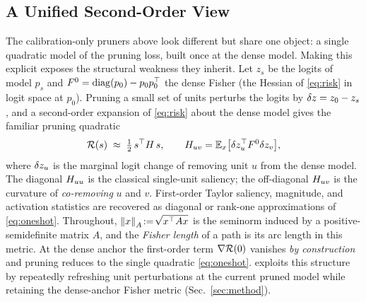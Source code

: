 \subsection{A Unified Second-Order View}
The calibration-only pruners above look different but share one object: a single quadratic model of the
pruning loss, built once at the dense model. Making this explicit exposes the structural weakness they
inherit.
Let $z_s$ be the logits of model $p_s$ and $F^0=\mathrm{diag}(p_0)-p_0p_0^\top$ the dense
Fisher (the Hessian of \eqref{eq:risk} in logit space at $p_0$). Pruning a small set of units perturbs
the logits by $\delta z=z_0-z_s$, and a second-order expansion of \eqref{eq:risk} about the dense model
gives the familiar pruning quadratic~\citep{lecun1989obd,hassibi1993obs,singh2020woodfisher}
\begin{equation}
\mathcal{R}(s)\;\approx\;\tfrac12\,s^\top H\, s,\qquad
H_{uv}=\mathbb{E}_{x}\big[\delta z_u^\top F^0 \delta z_v\big],
\label{eq:oneshot}
\end{equation}
where $\delta z_u$ is the marginal logit change of removing unit $u$ from the dense model. The diagonal
$H_{uu}$ is the classical single-unit saliency; the off-diagonal $H_{uv}$ is the curvature of
\emph{co-removing} $u$ and $v$. First-order Taylor saliency, magnitude, and activation statistics are
recovered as diagonal or rank-one approximations of \eqref{eq:oneshot}.
Throughout, $\left\lVert x \right\rVert_{A}\!:=\!\sqrt{x^\top A x}$ is the seminorm induced by a positive-semidefinite matrix $A$, and the \emph{Fisher length} of a path is its arc length in this metric.
At the dense anchor the first-order term
$\nabla\mathcal{R}(0)$ vanishes \emph{by construction} and pruning reduces to the single quadratic
\eqref{eq:oneshot}. \method exploits this structure by repeatedly refreshing unit perturbations at the
current pruned model while retaining the dense-anchor Fisher metric
(Sec.~\ref{sec:method}).

